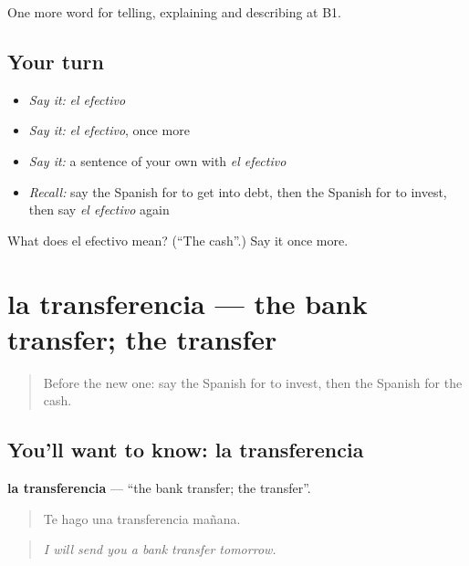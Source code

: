 \begin{grammarlens}[title={What you've built}]
One more word for telling, explaining and describing at B1.
\end{grammarlens}

\subsection*{Your turn}
\begin{itemize}
\raggedright
  \item \emph{Say it:} \emph{el efectivo}
  \item \emph{Say it:} \emph{el efectivo}, once more
  \item \emph{Say it:} a sentence of your own with \emph{el efectivo}
  \item \emph{Recall:} say the Spanish for to get into debt, then the Spanish for to invest, then say \emph{el efectivo} again
\end{itemize}

\begin{tcolorbox}[breakable,colback=teal!4,colframe=teal!35!black,title={Before you move on}]
What does el efectivo mean? (\textquotedblleft{}The cash\textquotedblright{}.) Say it once more.
\end{tcolorbox}
\section[la transferencia]{la transferencia — the bank transfer; the transfer}

\label{lesson:ES-C628-transferencia}



\begin{quote}
Before the new one: say the Spanish for to invest, then the Spanish for the cash.
\end{quote}

\subsection*{You'll want to know: la transferencia}
\textbf{la transferencia} — \textquotedblleft{}the bank transfer; the transfer\textquotedblright{}.

\begin{quote}
Te hago una transferencia mañana.
\end{quote}

\begin{quote}
\emph{I will send you a bank transfer tomorrow.}
\end{quote}

